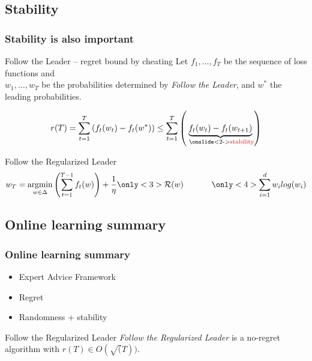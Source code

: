 \documentclass{beamer}
\newcommand{\mR}{\ensuremath{\mathcal{R}}}
\DeclareMathOperator*{\argmin}{argmin}
\newcommand{\inserteqstrut}[1]{%
	\rlap{$\displaystyle#1$}%
	\phantom{\biggesteq}}
\newcommand{\biggesteq}{%
	\vphantom{\sum_{i=1}^{d} w_i log(w_i)}%
	\hphantom{\sum_{i=1}^{d} w_i log(w_i)}%
}
\begin{document}
\subsection{Stability}
\begin{frame}
	\frametitle{Stability is also important}
		\begin{block}{Follow the Leader -- regret bound by cheating}
			Let $f_1 ,\ldots, f_T$ be the sequence of loss functions and \\
			$w_1 ,\ldots, w_T$ be the probabilities determined by \textit{Follow the Leader},
			and $w^*$ the leading probabilities.
			
			\begin{equation*}
				r(T) =  \sum_{t=1}^{T}  \left( f_t(w_t) - f_t(w^*) \right)
				\leq
				\sum_{t=1}^{T} \left( \underbrace{f_t(w_t) - f_t(w_{t+1})}_\text{ \onslide<2->{\textcolor{red}{stability}}} \right)
			\end{equation*}
		\end{block}

\pause[3]
	\begin{block}{Follow the Regularized Leader \only<4>{\textcolor{red}{with entropic regularizer}}}
	\begin{equation*}
	w_T
	= \argmin_{w \in \Delta}  \left(\sum_{t=1}^{T-1} f_t(w) \right) + \frac{1}{\eta}  \only<3>{\inserteqstrut{\mR(w)}} \only<4>{\inserteqstrut{\sum_{i=1}^{d} w_i log(w_i)}}
	\end{equation*}
	\end{block}

\end{frame}


\subsection{Online learning summary}
\begin{frame}
	\frametitle{Online learning summary}
	\begin{itemize}
		\item Expert Advice Framework \pause
		\item Regret \pause
		\item Randomness + stability \pause
	\end{itemize}
	
	\begin{block}{Follow the Regularized Leader}
		\textit{Follow the Regularized Leader} is a no-regret algorithm with $r(T)\in O(\sqrt(T))$.
	\end{block}
\end{frame}
\end{document}
